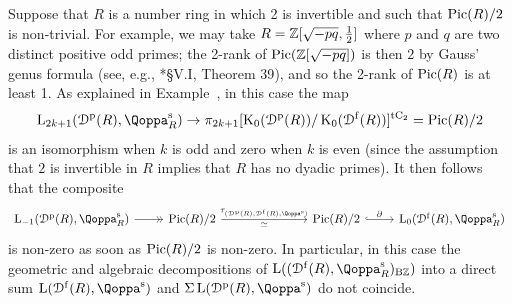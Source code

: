 \begin{example}
\label{example:concrete-difference}%
Suppose that $R$ is a number ring in which 2 is invertible and such that $\operatorname{Pic}(R)/2$ is non-trivial. For example, we may take $R = \mathbb{Z}[\sqrt{-pq},\tfrac{1}{2}]$ where $p$ and $q$ are two distinct positive odd primes; the 2-rank of $\operatorname{Pic}(\mathbb{Z}[\sqrt{-pq}])$ is then $2$ by Gauss' genus formula (see, e.g., \cite{frohlich-taylor}*{\S V.I, Theorem 39}), and so the 2-rank of $\operatorname{Pic}(R)$ is at least 1. %
As explained in Example~, in this case the map
\[
\L_{2k+1}(\Dperf(R),\QF^{\sym}_R) \to \pi_{2k+1}[\K_0(\Dperf(R))/\K_0(\Dfree(R))]^{\tC} = \Pic(R)/2
\]
is an isomorphism when $k$ is odd and zero when $k$ is even (since the assumption that $2$ is invertible in $R$ implies that $R$ has no dyadic primes).
It then follows that the composite
\[
\begin{tikzcd}
\L_{-1}(\Dperf(R),\QF^{\sym}_R) \ar[r, ->>] & \Pic(R)/2 \ar[rrr,"\tau_{(\Dperf(R),\Dfree(R),\QF^{\sym})}","\simeq"'] &&& \Pic(R)/2 \ar[r,"\partial", hook] & \L_0(\Dfree(R), \QF^{\sym}_R)
\end{tikzcd}
\]
is non-zero as soon as $\operatorname{Pic}(R)/2$ is non-zero. In particular, in this case the geometric and algebraic decompositions of $\L((\Dfree(R),\QF^{\sym}_R)_{\B\ZZ})$ into a direct sum $\L(\Dfree(R),\QF^{\sym})$ and $\Sig\L(\Dperf(R),\QF^{\sym})$ do not coincide.
\end{example}
